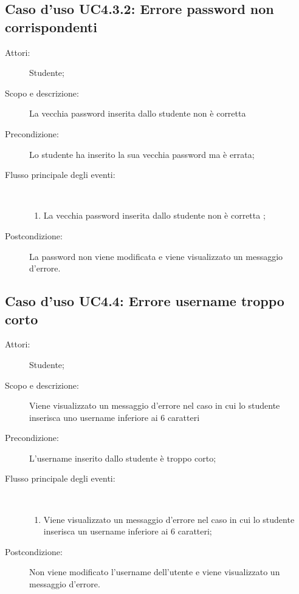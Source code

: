 \subsection{Caso d'uso UC4.3.2: Errore password non corrispondenti}\begin{description}
\item[Attori:] Studente;
\item[Scopo e descrizione:] La vecchia password inserita dallo studente non è corretta
      \item[Precondizione:] Lo studente ha inserito la sua vecchia password ma è errata;

        \item[Flusso principale degli eventi:] \ 
 \begin{enumerate}
          \item La vecchia password inserita dallo studente non è corretta
;

      \end{enumerate}
    \item[Postcondizione:] La password non viene modificata e viene visualizzato un messaggio d'errore.
  \end{description}
\hypertarget{UC4.4}{}
\subsection{Caso d'uso UC4.4: Errore username troppo corto}\begin{description}
\item[Attori:] Studente;
\item[Scopo e descrizione:] Viene visualizzato un messaggio d'errore nel caso in cui lo studente inserisca uno username inferiore ai 6 caratteri
      \item[Precondizione:] L'username inserito dallo studente è troppo corto;

        \item[Flusso principale degli eventi:] \ 
 \begin{enumerate}
          \item Viene visualizzato un messaggio d'errore nel caso in cui lo studente inserisca un username inferiore ai 6 caratteri;

      \end{enumerate}
    \item[Postcondizione:] Non viene modificato l'username dell'utente e viene visualizzato un messaggio d'errore.
  \end{description}
\hypertarget{UC4.5}{}

